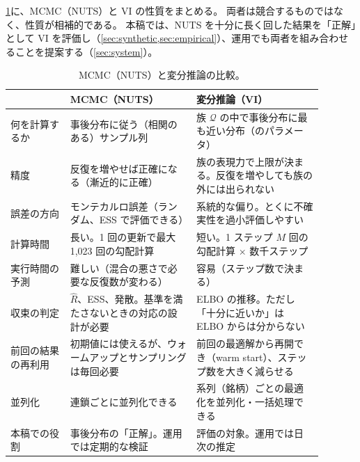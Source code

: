 \cref{tab:mcmc-vs-vi}に、MCMC（NUTS）と VI の性質をまとめる。
両者は競合するものではなく、性質が相補的である。
本稿では、NUTS を十分に長く回した結果を「正解」として VI を評価し（\cref{sec:synthetic,sec:empirical}）、運用でも両者を組み合わせることを提案する（\cref{sec:system}）。

\begin{table}[tbp]
  \centering
  \caption{MCMC（NUTS）と変分推論の比較。}
  \label{tab:mcmc-vs-vi}
  \small
  \begin{tabular}{p{0.17\linewidth}p{0.36\linewidth}p{0.36\linewidth}}
    \toprule
     & MCMC（NUTS） & 変分推論（VI） \\
    \midrule
    何を計算するか & 事後分布に従う（相関のある）サンプル列 & 族 $\mathcal{Q}$ の中で事後分布に最も近い分布（のパラメータ） \\
    \addlinespace
    精度 & 反復を増やせば正確になる（漸近的に正確） & 族の表現力で上限が決まる。反復を増やしても族の外には出られない \\
    \addlinespace
    誤差の方向 & モンテカルロ誤差（ランダム、ESS で評価できる） & 系統的な偏り。とくに不確実性を過小評価しやすい \\
    \addlinespace
    計算時間 & 長い。1 回の更新で最大 1,023 回の勾配計算 & 短い。1 ステップ $M$ 回の勾配計算 × 数千ステップ \\
    \addlinespace
    実行時間の予測 & 難しい（混合の悪さで必要な反復数が変わる） & 容易（ステップ数で決まる） \\
    \addlinespace
    収束の判定 & $\hat R$、ESS、発散。基準を満たさないときの対応の設計が必要 & ELBO の推移。ただし「十分に近いか」は ELBO からは分からない \\
    \addlinespace
    前回の結果の再利用 & 初期値には使えるが、ウォームアップとサンプリングは毎回必要 & 前回の最適解から再開でき（warm start）、ステップ数を大きく減らせる \\
    \addlinespace
    並列化 & 連鎖ごとに並列化できる & 系列（銘柄）ごとの最適化を並列化・一括処理できる \\
    \addlinespace
    本稿での役割 & 事後分布の「正解」。運用では定期的な検証 & 評価の対象。運用では日次の推定 \\
    \bottomrule
  \end{tabular}
\end{table}
